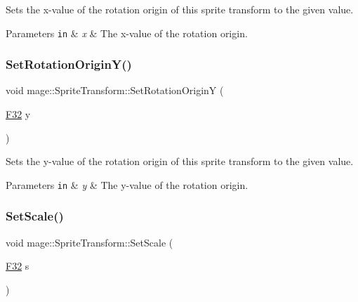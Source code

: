 Sets the x-\/value of the rotation origin of this sprite transform to the given value.


\begin{DoxyParams}[1]{Parameters}
\mbox{\tt in}  & {\em x} & The x-\/value of the rotation origin. \\
\hline
\end{DoxyParams}
\hypertarget{classmage_1_1_sprite_transform_a8ccfaf7282419ed636cc97f911472604}{}\label{classmage_1_1_sprite_transform_a8ccfaf7282419ed636cc97f911472604} 
\subsubsection{\texorpdfstring{Set\+Rotation\+Origin\+Y()}{SetRotationOriginY()}}
{\footnotesize\ttfamily void mage\+::\+Sprite\+Transform\+::\+Set\+Rotation\+OriginY (\begin{DoxyParamCaption}\item[{\hyperlink{namespacemage_aa97e833b45f06d60a0a9c4fc22ae02c0}{F32}}]{y }\end{DoxyParamCaption})\hspace{0.3cm}{\ttfamily [noexcept]}}

Sets the y-\/value of the rotation origin of this sprite transform to the given value.


\begin{DoxyParams}[1]{Parameters}
\mbox{\tt in}  & {\em y} & The y-\/value of the rotation origin. \\
\hline
\end{DoxyParams}
\hypertarget{classmage_1_1_sprite_transform_ad11fab7a12f6d1ce79eab12e16adab93}{}\label{classmage_1_1_sprite_transform_ad11fab7a12f6d1ce79eab12e16adab93} 
\subsubsection{\texorpdfstring{Set\+Scale()}{SetScale()}\hspace{0.1cm}{\footnotesize\ttfamily [1/4]}}
{\footnotesize\ttfamily void mage\+::\+Sprite\+Transform\+::\+Set\+Scale (\begin{DoxyParamCaption}\item[{\hyperlink{namespacemage_aa97e833b45f06d60a0a9c4fc22ae02c0}{F32}}]{s }\end{DoxyParamCaption})\hspace{0.3cm}{\ttfamily [noexcept]}}

